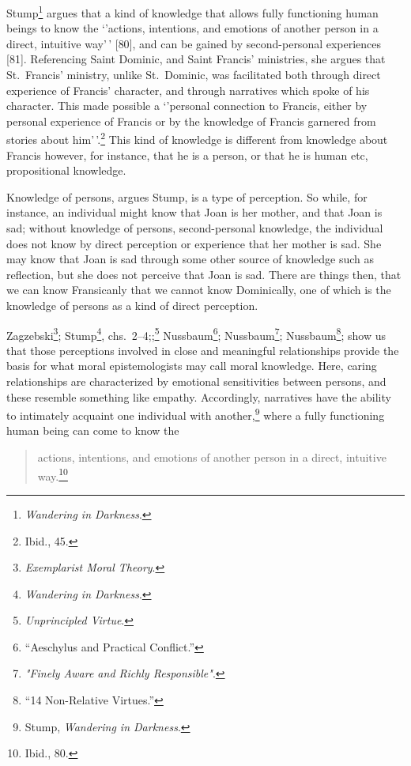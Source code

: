 \documentclass[phdthesis,12pt,final]{wuthesis}
\theoremstyle{definition}
\theoremstyle{definition}
\theoremstyle{definition}
\theoremstyle{definition}
\theoremstyle{remark}
\begin{document}
Stump\footnote{\emph{Wandering in {Darkness}}.} argues that a kind of knowledge that allows fully functioning human beings to know the `'actions, intentions, and emotions of another person in a direct, intuitive way'\,' {[}80{]}, and can be gained by second-personal experiences
{[}81{]}. Referencing Saint Dominic, and Saint Francis' ministries, she argues that St.~Francis' ministry, unlike St.~Dominic, was facilitated both through
direct experience of Francis' character, and through narratives which
spoke of his character. This made possible a `'personal
connection to Francis, either by personal experience of Francis or by
the knowledge of Francis garnered from stories about him'\,'.\footnote{Ibid., 45.} This kind of knowledge is different from knowledge about Francis however, for
instance, that he is a person, or that he is human etc, propositional knowledge.

Knowledge of persons, argues Stump, is a type of perception. So while,
for instance, an individual might know that Joan is her mother, and
that Joan is sad; without knowledge of persons, second-personal knowledge, the individual does not know by direct perception or experience that her mother is sad. She may know that Joan is sad through some other source of knowledge such as reflection, but she does not perceive that Joan is sad. There are things then, that we can know Fransicanly that we cannot know Dominically, one of which is the knowledge of persons as a kind of direct perception.

Zagzebski\footnote{\emph{Exemplarist {Moral Theory}}.}; Stump\footnote{\emph{Wandering in {Darkness}}.}, chs.~2--4;;\footnote{\emph{Unprincipled {Virtue}}.} Nussbaum\footnote{{``Aeschylus and Practical Conflict.''}}; Nussbaum\footnote{\emph{"{Finely Aware} and {Richly Responsible}"}.}; Nussbaum\footnote{{``14 {Non-Relative Virtues}.''}}; show us that those perceptions involved in close and meaningful relationships provide the basis for what moral epistemologists may call moral knowledge. Here, caring relationships are characterized by emotional sensitivities between persons, and these resemble something like empathy. Accordingly, narratives have the ability to intimately acquaint one individual with another,\footnote{Stump, \emph{Wandering in {Darkness}}.} where a fully functioning human being can come to know the

\begin{quote}
actions, intentions, and emotions of another person in a direct, intuitive way.\footnote{Ibid., 80.}
\end{quote}
\end{document}
